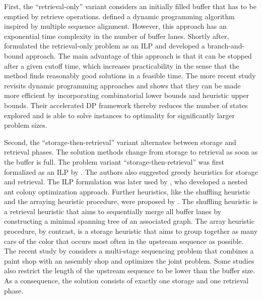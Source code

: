 \documentclass[11pt]{elsarticle}
\newcommand{\blackversion}{ }
\newcommand{\blackorcolor}{
\ifdefined\blackversion
	\color{black}
\fi
}
\newcommand{\REV}[1]{{\color{myblue}\blackorcolor #1}}
\begin{document}
First, the ``retrieval-only'' variant considers an initially filled buffer that has to be emptied by retrieve operations. 
\citet{Epping.2003} defined a dynamic programming algorithm inspired by multiple sequence alignment. However, this approach has an exponential time complexity in the number of buffer lanes. Shortly after, \citet{spieckermann_sequential_2004} formulated the retrieval-only problem as an ILP and developed a branch-and-bound approach. The main advantage of this approach is that it can be stopped after a given cutoff time, which increases practicability in the sense that the method finds reasonably good solutions in a feasible time. \REV{The more recent study \citet{hong2018accelerated} revisits dynamic programming approaches and shows that they can be made more efficient by incorporating combinatorial lower bounds and heuristic upper bounds. Their accelerated DP framework thereby reduces the number of states explored and is able to solve instances to optimality for significantly larger problem sizes.}

Second, the ``storage-then-retrieval'' variant alternates between storage and retrieval phases. The solution methods change from storage to retrieval as soon as the buffer is full. The problem variant ``storage-then-retrieval'' was first formalized as an ILP by \citet{Ding.2004}. The authors also suggested greedy heuristics for storage and retrieval. The ILP formulation was later used by \citet{Lin.2011}, who developed a nested ant colony optimization approach. Further heuristics, like the shuffling heuristic and the arraying heuristic procedure, were proposed by \citet{sun2015colour}. The shuffling heuristic is a retrieval heuristic that aims to sequentially merge all buffer lanes by constructing a minimal spanning tree of an associated graph. The array heuristic procedure, by contrast, is a storage heuristic that aims to group together as many cars of the color that occurs most often in the upstream sequence as possible. The recent study by \citet{wu2021mathematical} considers a multi-stage sequencing problem that combines a paint shop with an assembly shop and optimizes the joint problem. 
Some studies \citep[e.g.,][]{Lin.2011,wu2021mathematical} also restrict the length of the upstream sequence to be lower than the buffer size. As a consequence, the solution consists of exactly one storage and one retrieval phase. 
\end{document}
